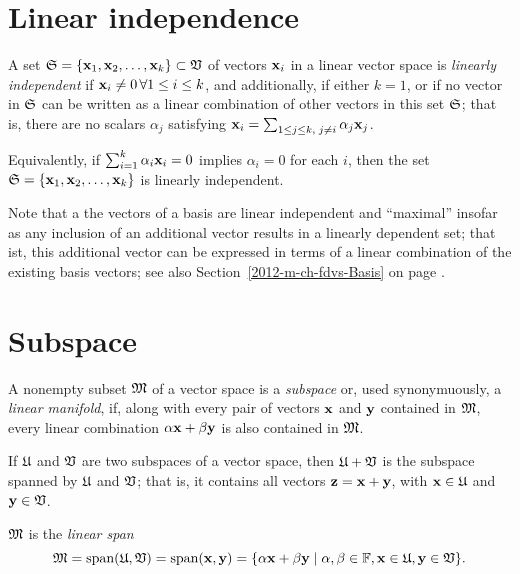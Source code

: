 \section{Linear independence}

A set ${\frak S}=\{
{\bf x}_1,
{\bf x}_2,
\ldots ,
{\bf x}_k\} \subset {\frak V}$
of vectors ${\bf x}_i$ in a linear vector space
is {\em linearly independent}
if ${\bf x}_i\neq 0\,\forall 1\le i\le k$,
and additionally, if either $k=1$,
or if no vector in ${\frak S}$ can be written as a linear combination of other vectors in this set ${\frak S}$;
that is, there are no scalars $\alpha_j$ satisfying
 ${\bf x}_i=\sum_{1\le j \le k, \; j\neq i}\alpha_j {\bf x}_j$.

Equivalently, if $\sum_{i=1}^k \alpha_i {\bf x}_i = 0$
 implies $\alpha_i =0$ for each $i$, then the set
${\frak S}=\{
{\bf x}_1,
{\bf x}_2,
\ldots ,
{\bf x}_k\}  $ is linearly independent.


Note that a the vectors of a basis are linear independent and ``maximal''
insofar as any inclusion of an additional vector results in a linearly dependent set;
that ist, this additional vector can be expressed in terms of a linear combination of the
existing basis vectors; see also Section~\ref{2012-m-ch-fdvs-Basis} on page \pageref{2012-m-ch-fdvs-Basis}.

\section{Subspace}
\label{2011-m-subspace}
A nonempty subset ${\frak M}$ of a vector space is a {\em subspace}
or, used synonymuously,
a {\em linear manifold},
 if, along with every pair of vectors ${\bf x}$   and  ${\bf y}$
 contained in  ${\frak M}$,
 every linear combination
$\alpha {\bf x} + \beta {\bf y}$ is also contained in  ${\frak M}$.

If
${\frak U}$
and
${\frak V}$
are two subspaces of a vector space,
then
${\frak U}+{\frak V}$
is the subspace spanned by
${\frak U}$
and
${\frak V}$;
that is,
it contains all vectors
${\bf z}={\bf x}+{\bf y}$, with
${\bf x}\in {\frak U}$  and
${\bf y}\in {\frak V}$.

${\frak M}$ is the {\em linear span}
\begin{equation}
{\frak M}
= \textrm{span}({\frak U},{\frak V})
= \textrm{span}({\bf x},{\bf y}) =
\{\alpha {\bf x} +\beta {\bf y}\mid \alpha ,\beta \in {\Bbb F}, {\bf x} \in {\frak U},
{\bf y} \in {\frak V}\}.
\end{equation}



